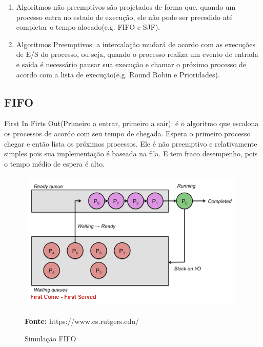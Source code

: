 \documentclass[times, 10pt,twocolumn]{article}
\begin{document}
\begin{enumerate}
\item  Algoritmos não preemptivos são projetados de forma que, quando um processo entra no estado de execução, ele não pode ser precedido até completar o tempo alocado(e.g. FIFO e SJF).
\item Algoritmos Preemptivos: a intercalação mudará de acordo com as execuções de E/S do processo, ou seja, quando o processo realiza um evento de entrada e saída é necessário pausar sua execução e chamar o próximo processo de acordo com a lista de execução(e.g. Round Robin e Prioridades). 
\end{enumerate} 
 
 
\subsection{FIFO} 
First In Firts Out(Primeiro a entrar, primeiro a sair): é o algoritmo que escalona os processos de acordo com seu tempo de chegada. Espera o primeiro processo chegar e então lista os próximos processos. Ele é não preemptivo e relativamente simples pois sua implementação é baseada na fila. E tem fraco desempenho, pois o tempo médio de espera é alto.\cite{rutgers} 
\begin{figure}[!htb]
	\centering
	\includegraphics[width=.5\textwidth]{figuras/ilusfifo}
	\caption{Simulação FIFO} 
	\textbf{Fonte:} https://www.cs.rutgers.edu/ \cite{rutgers}
	\label{fig:figura-ilus1}
\end{figure}      
 
\end{document}

